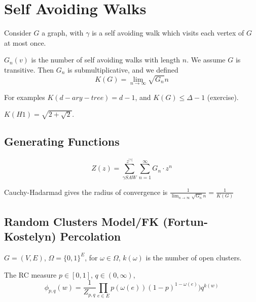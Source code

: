 
\chapter{Self Avoiding Walks}
\label{cha:self-avoiding-walks}

Consider $G$ a graph, with $\gamma$ is a self avoiding walk which
visits each vertex of $G$ at most once.

$G_{n}(v)$ is the number of self avoiding walks with length $n$.  We
assume $G$ is transitive.  Then $G_n$ is submultiplicative, and we
defined
\begin{equation}
  \label{eq:47}
  K(G) = \lim_{n \rightarrow \infty} \sqrt{G_{n}}{n}
\end{equation}

For examples $K(d-ary-tree) = d - 1$, and $K(G) \leq \Delta - 1$
(exercise).

\begin{thm}
  \label{defn:random_walks_on_graphs:29}
  $K(H1) = \sqrt{2 + \sqrt{2}}$.
\end{thm}

\section{Generating Functions}
\label{sec:generating-functions}

\begin{equation}
  \label{eq:48}
  Z(z) = \sum_{\gamma SAW}^{z^{|\gamma|}}  \sum_{n=1}^{\infty} G_{n} \cdot z^{n}
\end{equation}

Cauchy-Hadarmad gives the radius of convergence is $\frac{1}{\lim_{n
    \rightarrow \infty} \sqrt{G_{n}}{n}} = \frac{1}{K(G)}$


\section{Random Clusters Model/FK (Fortun-Kostelyn) Percolation}
\label{sec:rand-clust-modelfk}

\begin{defn}
  \label{defn:random_walks_on_graphs:30}
  $G = (V, E)$, $\Omega = \{ 0, 1 \}^{E}$, for $\omega \in \Omega$,
  $k(\omega)$ is the  number of open clusters.

  The RC measure $p \in [0, 1]$, $q \in (0, \infty)$,
  \begin{equation}
    \label{eq:49}
    \phi_{p, q}(w) = \frac{1}{Z_{p, q}} \prod_{e \in E} p(\omega(e)) (1-p)^{1 -
      \omega(e)})  q^{k(w)}
  \end{equation}
\end{defn}

